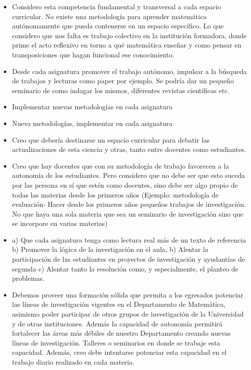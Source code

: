 \documentclass[a4paper,10pt,BCOR10mm,oneside,headsepline]{scrbook}
\begin{document}
\begin{subappendices}
\begin{itemize}
\item Considero esta competencia fundamental y transversal a cada espacio curricular. No existe una metodología para aprender matemática autónomamente que pueda contenerse en un espacio específico.  Lo que considero que nos falta es trabajo colectivo en la institución formadora, donde prime el acto reflexivo en torno a qué matemática enseñar y como pensar en transposiciones que hagan funcional ese conocimiento. 

\item Desde cada asignatura promover el trabajo autónomo, impulsar a la búsqueda de trabajos y lecturas como paper por ejemplo. Se podría dar un pequeño seminario de como indagar los mismos, diferentes revistas científicas etc.

\item Implementar nuevas metodologías en cada asignatura

\item Nueva metodologías, implementar en cada asignatura 

\item Creo que debería destinarse un espacio curricular para debatir las actualizaciones de esta ciencia y otras, tanto entre docentes como estudiantes.

\item Creo que hay docentes que con su metodología de trabajo favorecen a la autonomía de los estudiantes. Pero considero que  no debe ser que esto suceda por las persona en sí que estén como docentes, sino debe ser algo propio de todas las materias desde los primeros años (Ejemplo: metodología de evaluación- Hacer desde los primeros años pequeños trabajos de investigación. No que haya una sola materia que sea un seminario de investigación sino que se incorpore en varias materias)

\item a) Que cada asignatura tenga como lectura real más de un texto de referencia b) Promover la lógica de la investigación en el aula, b) Alentar la participación de lxs estudiantes en proyectos de investigación y ayudantías de segunda c) Alentar tanto la resolución como, y especialmente, el planteo de problemas.

\item Debemos proveer una formación sólida que permita a los egresados  potenciar las líneas de investigación vigentes en el Departamento de Matemática, asimismo poder participar de otros grupos de investigación de la Universidad y  de otras instituciones. Además la capacidad de autonomía permitirá fortalecer las áreas más débiles de nuestro Departamento creando nuevas líneas de investigación. 
Talleres o seminarios en donde se trabaje esta capacidad. Además, creo debe intentarse potenciar esta capacidad en el trabajo diario realizado en cada materia.
\end{itemize}


\end{subappendices}
\end{document}
